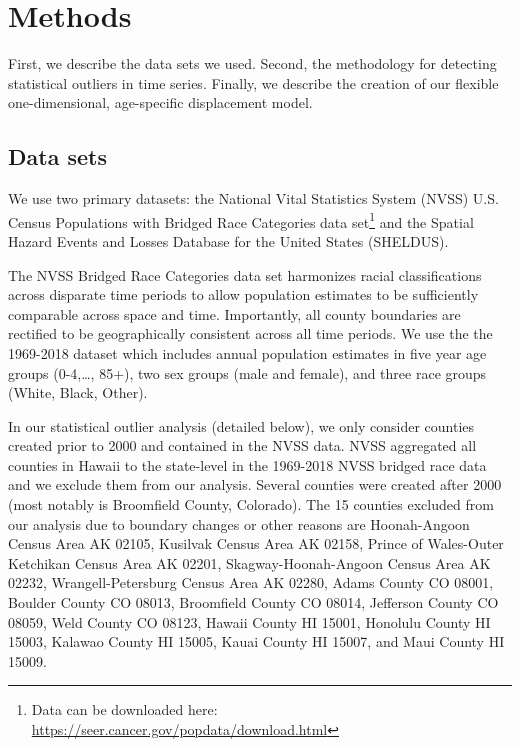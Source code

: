 \documentclass[12pt]{article}
\begin{document}
\hypertarget{methods}{%
\section{Methods}\label{methods}}

First, we describe the data sets we used. Second, the methodology for
detecting statistical outliers in time series. Finally, we describe the
creation of our flexible one-dimensional, age-specific displacement
model.

\hypertarget{data-sets}{%
\subsection{Data sets}\label{data-sets}}

We use two primary datasets: the National Vital Statistics System (NVSS)
U.S. Census Populations with Bridged Race Categories data set\footnote{Data
  can be downloaded here:
  \url{https://seer.cancer.gov/popdata/download.html}} and the Spatial
Hazard Events and Losses Database for the United States (SHELDUS).

The NVSS Bridged Race Categories data set harmonizes racial
classifications across disparate time periods to allow population
estimates to be sufficiently comparable across space and time.
Importantly, all county boundaries are rectified to be geographically
consistent across all time periods. We use the the 1969-2018 dataset
which includes annual population estimates in five year age groups
(0-4,\ldots, 85+), two sex groups (male and female), and three race
groups (White, Black, Other).

In our statistical outlier analysis (detailed below), we only consider
counties created prior to 2000 and contained in the NVSS data. NVSS
aggregated all counties in Hawaii to the state-level in the 1969-2018
NVSS bridged race data and we exclude them from our analysis. Several
counties were created after 2000 (most notably is Broomfield County,
Colorado). The 15 counties excluded from our analysis due to boundary
changes or other reasons are Hoonah-Angoon Census Area AK 02105,
Kusilvak Census Area AK 02158, Prince of Wales-Outer Ketchikan Census
Area AK 02201, Skagway-Hoonah-Angoon Census Area AK 02232,
Wrangell-Petersburg Census Area AK 02280, Adams County CO 08001, Boulder
County CO 08013, Broomfield County CO 08014, Jefferson County CO 08059,
Weld County CO 08123, Hawaii County HI 15001, Honolulu County HI 15003,
Kalawao County HI 15005, Kauai County HI 15007, and Maui County HI
15009.
\end{document}
